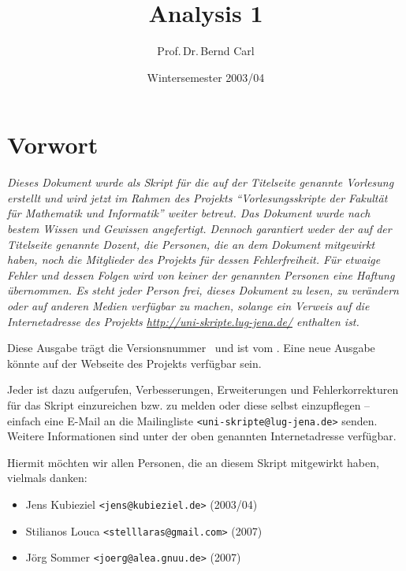 \documentclass[ngerman,titlepage,twoside, parskip=half*]{scrreprt}
\theoremstyle{plain}
\theoremstyle{definition}
\theoremstyle{remark}
\begin{document}
\title{Analysis 1}
\author{Prof.\,Dr.\,Bernd Carl}
\date{Wintersemester 2003/04}

\maketitle

\clearpage
\chapter*{Vorwort}

{\itshape
  Dieses Dokument wurde als Skript für die auf der Titelseite genannte
  Vorlesung erstellt und wird jetzt im Rahmen des Projekts "`Vorlesungsskripte
  der Fakultät für Mathematik und Informatik"' weiter betreut. Das Dokument
  wurde nach bestem Wissen und Gewissen angefertigt. Dennoch garantiert weder
  der auf der Titelseite genannte Dozent, die Personen, die an dem Dokument
  mitgewirkt haben, noch die Mitglieder des Projekts für dessen
  Fehlerfreiheit. Für etwaige Fehler und dessen Folgen wird von keiner der
  genannten Personen eine Haftung übernommen. Es steht jeder Person frei,
  dieses Dokument zu lesen, zu verändern oder auf anderen Medien verfügbar zu
  machen, solange ein Verweis auf die Internetadresse des Projekts
  \url{http://uni-skripte.lug-jena.de/} enthalten ist.

  Diese Ausgabe trägt die Versionsnummer~\SVNLastChangedRevision{} und ist vom
  \SVNDate{}. Eine neue Ausgabe könnte auf der Webseite des Projekts
  verfügbar sein.

  Jeder ist dazu aufgerufen, Verbesserungen, Erweiterungen und
  Fehlerkorrekturen für das Skript einzureichen bzw. zu melden oder diese
  selbst einzupflegen -- einfach eine E-Mail an die Mailingliste
  \texttt{<uni-skripte@lug-jena.de>} senden. Weitere Informationen sind
  unter der oben genannten Internetadresse verfügbar.

  Hiermit möchten wir allen Personen, die an diesem Skript mitgewirkt haben,
  vielmals danken:
  \begin{itemize}
   \item Jens Kubieziel \texttt{<jens@kubieziel.de>} (2003/04)
   \item Stilianos Louca \texttt{<stelllaras@gmail.com>} (2007)
   \item Jörg Sommer \texttt{<joerg@alea.gnuu.de>} (2007)
  \end{itemize}
}

\tableofcontents{}
\end{document}
